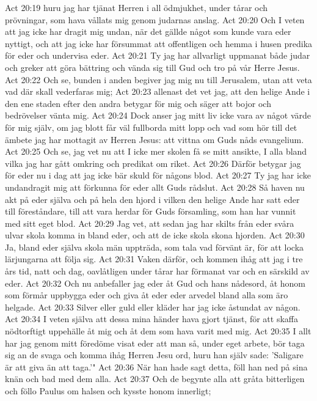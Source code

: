 Act 20:19  huru jag har tjänat Herren i all ödmjukhet, under tårar och prövningar, som hava vållats mig genom judarnas anslag.
Act 20:20  Och I veten att jag icke har dragit mig undan, när det gällde något som kunde vara eder nyttigt, och att jag icke har försummat att offentligen och hemma i husen predika för eder och undervisa eder.
Act 20:21  Ty jag har allvarligt uppmanat både judar och greker att göra bättring och vända sig till Gud och tro på vår Herre Jesus.
Act 20:22  Och se, bunden i anden begiver jag mig nu till Jerusalem, utan att veta vad där skall vederfaras mig;
Act 20:23  allenast det vet jag, att den helige Ande i den ene staden efter den andra betygar för mig och säger att bojor och bedrövelser vänta mig.
Act 20:24  Dock anser jag mitt liv icke vara av något värde för mig själv, om jag blott får väl fullborda mitt lopp och vad som hör till det ämbete jag har mottagit av Herren Jesus: att vittna om Guds nåds evangelium.
Act 20:25  Och se, jag vet nu att I icke mer skolen få se mitt ansikte, I alla bland vilka jag har gått omkring och predikat om riket.
Act 20:26  Därför betygar jag för eder nu i dag att jag icke bär skuld för någons blod.
Act 20:27  Ty jag har icke undandragit mig att förkunna för eder allt Guds rådslut.
Act 20:28  Så haven nu akt på eder själva och på hela den hjord i vilken den helige Ande har satt eder till föreståndare, till att vara herdar för Guds församling, som han har vunnit med sitt eget blod.
Act 20:29  Jag vet, att sedan jag har skilts från eder svåra ulvar skola komma in bland eder, och att de icke skola skona hjorden.
Act 20:30  Ja, bland eder själva skola män uppträda, som tala vad förvänt är, för att locka lärjungarna att följa sig.
Act 20:31  Vaken därför, och kommen ihåg att jag i tre års tid, natt och dag, oavlåtligen under tårar har förmanat var och en särskild av eder.
Act 20:32  Och nu anbefaller jag eder åt Gud och hans nådesord, åt honom som förmår uppbygga eder och giva åt eder eder arvedel bland alla som äro helgade.
Act 20:33  Silver eller guld eller kläder har jag icke åstundat av någon.
Act 20:34  I veten själva att dessa mina händer hava gjort tjänst, för att skaffa nödtorftigt uppehälle åt mig och åt dem som hava varit med mig.
Act 20:35  I allt har jag genom mitt föredöme visat eder att man så, under eget arbete, bör taga sig an de svaga och komma ihåg Herren Jesu ord, huru han själv sade: 'Saligare är att giva än att taga.'"
Act 20:36  När han hade sagt detta, föll han ned på sina knän och bad med dem alla.
Act 20:37  Och de begynte alla att gråta bitterligen och föllo Paulus om halsen och kysste honom innerligt;
